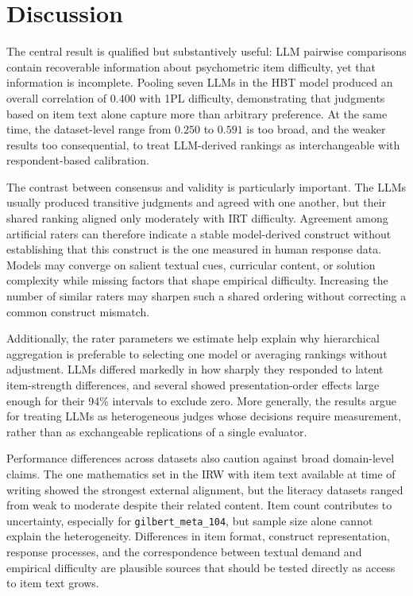 \documentclass[11pt]{article}
\begin{document}
\section{Discussion}
\label{sec:discussion}

The central result is qualified but substantively useful: LLM pairwise comparisons contain recoverable information about psychometric item difficulty, yet that information is incomplete. Pooling seven LLMs in the HBT model produced an overall correlation of $0.400$ with 1PL difficulty, demonstrating that judgments based on item text alone capture more than arbitrary preference. At the same time, the dataset-level range from $0.250$ to $0.591$ is too broad, and the weaker results too consequential, to treat LLM-derived rankings as interchangeable with respondent-based calibration.

The contrast between consensus and validity is particularly important. The LLMs usually produced transitive judgments and agreed with one another, but their shared ranking aligned only moderately with IRT difficulty. Agreement among artificial raters can therefore indicate a stable model-derived construct without establishing that this construct is the one measured in human response data. Models may converge on salient textual cues, curricular content, or solution complexity while missing factors that shape empirical difficulty. Increasing the number of similar raters may sharpen such a shared ordering without correcting a common construct mismatch.

Additionally, the rater parameters we estimate help explain why hierarchical aggregation is preferable to selecting one model or averaging rankings without adjustment. LLMs differed markedly in how sharply they responded to latent item-strength differences, and several showed presentation-order effects large enough for their 94\% intervals to exclude zero. More generally, the results argue for treating LLMs as heterogeneous judges whose decisions require measurement, rather than as exchangeable replications of a single evaluator.

Performance differences across datasets also caution against broad domain-level claims. The one mathematics set in the IRW with item text available at time of writing showed the strongest external alignment, but the literacy datasets ranged from weak to moderate despite their related content. Item count contributes to uncertainty, especially for \texttt{gilbert\_meta\_104}, but sample size alone cannot explain the heterogeneity. Differences in item format, construct representation, response processes, and the correspondence between textual demand and empirical difficulty are plausible sources that should be tested directly as access to item text grows.
\end{document}
